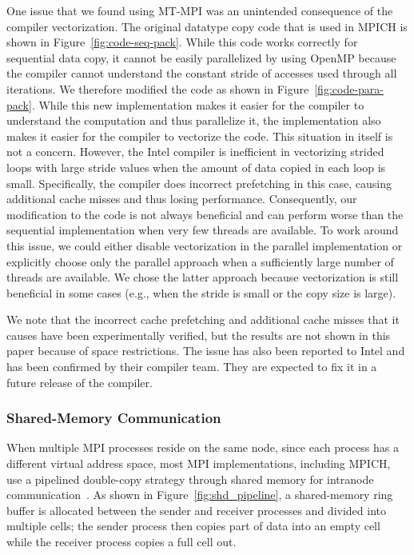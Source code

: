 One issue that we found using MT-MPI was an unintended consequence of
the compiler vectorization.  The original data\-type copy code that is
used in MPICH is shown in Figure~\ref{fig:code-seq-pack}.  While this
code works correctly for sequential data copy, it cannot be easily
parallelized by using OpenMP because the compiler cannot understand
the constant stride of accesses used through all iterations.  We
therefore modified the code as shown in
Figure~\ref{fig:code-para-pack}.  While this new implementation makes
it easier for the compiler to understand the computation and thus
parallelize it, the implementation also makes it easier for the
compiler to vectorize the code.  This situation in itself is not a
concern.  However, the Intel compiler is inefficient in vectorizing
strided loops with large stride values when the amount of data copied
in each loop is small.  Specifically, the compiler does incorrect
prefetching in this case, causing additional cache misses and thus
losing performance.  Consequently, our modification to the code is not
always beneficial and can perform worse than the sequential
implementation when very few threads are available.  To work around
this issue, we could either disable vectorization in the parallel
implementation or explicitly choose only the parallel approach when a
sufficiently large number of threads are available.  We chose the
latter approach because vectorization is still beneficial in some
cases (e.g., when the stride is small or the copy size is large).

We note that the incorrect cache prefetching and additional cache
misses that it causes have been experimentally verified, but the
results are not shown in this paper because of space restrictions.
The issue has also been reported to Intel and has been confirmed by
their compiler team.  They are expected to fix it in a future release
of the compiler.

\subsubsection{Shared-Memory Communication}\label{sec:imp-lmt}

When multiple MPI processes reside on the same node, since each
process has a different virtual address space, most MPI
implementations, including MPICH, use a pipelined double-copy strategy
through shared memory for intranode communication~\cite{mpich-lmt}.
As shown in Figure~\ref{fig:shd_pipeline}, a shared-memo\-ry ring buffer
is allocated between the sender and receiver processes and divided
into multiple cells; the sender process then copies part of data into
an empty cell while the receiver process copies a full cell out.

